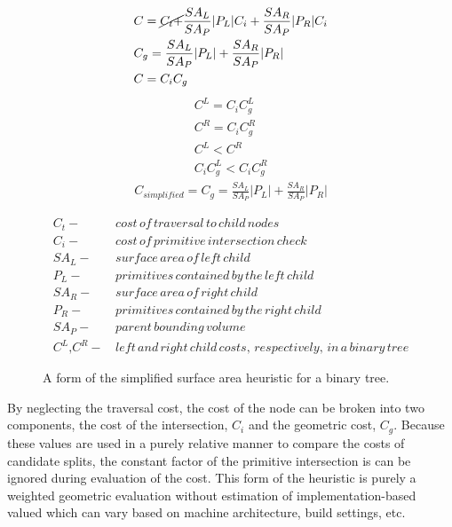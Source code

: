 \begin{figure}[H]
  \begin{align}
&C =  \cancel{C_{t} +} \frac{SA_{L}}{SA_{P}} |P_{L}|C_{i} + \frac{SA_{R}}{SA_{P}} |P_{R}|C_{i} \\
&C_{g} = \frac{SA_{L}}{SA_{P}} |P_{L}| +  \frac{SA_{R}}{SA_{P}}|P_{R}| \\
&C = C_{i}C_{g}
  \end{align}
  \begin{align*}
    C^{L} = C_{i} C^{L}_{g} \\
    C^{R} = C_{i} C^{R}_{g} \\
    C^{L} < C^{R} \\
    C_{i}C^{L}_{g} < C_{i}C^{R}_{g}
  \end{align*}
  \begin{align}
    C_{simplified} = C_{g} = \frac{SA_{L}}{SA_{P}} |P_{L}| +
    \frac{SA_{R}}{SA_{P}}|P_{R}|
    \label{eq:simplified_sah}
  \end{align}

  \begin{align*}
    C_{t} - & \,cost\, of\, traversal\, to\, child\, nodes \\
    C_{i} - & \, cost\, of\, primitive\, intersection\, check\, \\
    SA_{L} - &  \,surface\, area\, of\, left\, child \\
    P_{L} - & \, primitives\, contained\, by\, the\, left\, child  \\
    SA_{R} - & \, surface\, area\, of\, right\, child \\
    P_{R} - & \, primitives\, contained\, by\, the\, right\, child \\
    SA_{P} - & \, parent\, bounding\, volume \\
    C^{L} \text{,} C^{R} - & \, left \, and \, right \, child \, costs, \, respectively, \, in \, a \, binary \, tree
  \end{align*}
  
  \caption[Definition of the simplified surface area heuristic.]{A form of the
    simplified surface area heuristic for a binary tree.}
  \label{fig:SSAH}
\end{figure}

By neglecting the traversal cost, the cost of the node can be broken into two
components, the cost of the intersection, $C_{i}$ and the geometric cost,
$C_{g}$. Because these values are used in a purely relative manner to compare
the costs of candidate splits, the constant factor of the primitive intersection
is can be ignored during evaluation of the cost. This form of the heuristic is
purely a weighted geometric evaluation without estimation of
implementation-based valued which can vary based on machine architecture, build
settings, etc.

